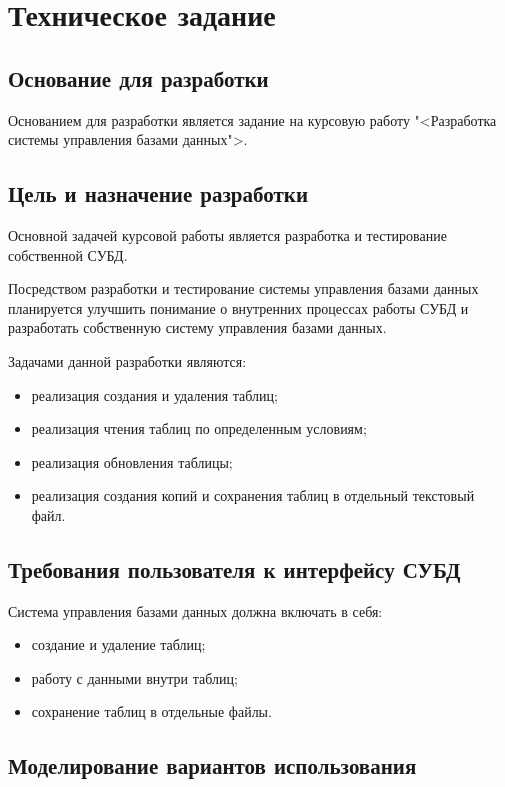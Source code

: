 \section{Техническое задание}
\subsection{Основание для разработки}

Основанием для разработки является задание на курсовую работу "<Разработка системы управления базами данных">.

\subsection{Цель и назначение разработки}

Основной задачей курсовой работы является разработка и тестирование собственной СУБД.

Посредством разработки и тестирование системы управления базами данных планируется улучшить понимание о внутренних процессах работы СУБД и разработать собственную систему управления базами данных.

Задачами данной разработки являются:
\begin{itemize}
\item реализация создания и удаления таблиц;
\item реализация чтения таблиц по определенным условиям;
\item реализация обновления таблицы;
\item реализация создания копий и сохранения таблиц в отдельный текстовый файл.
\end{itemize}

\subsection{Требования пользователя к интерфейсу СУБД}

Система управления базами данных должна включать в себя:
\begin{itemize}
    \item создание и удаление таблиц;
    \item работу с данными внутри таблиц;
    \item сохранение таблиц в отдельные файлы.
\end{itemize}

\subsection{Моделирование вариантов использования}

